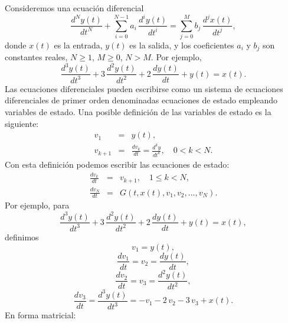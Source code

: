 \documentclass[11pt,a4paper,openany]{book}
\begin{document}
Consideremos una ecuación diferencial
\begin{equation}
	\frac{d^{N} y(t)}{dt^{N}} + \sum_{i=0}^{N-1} a_{i} \, \frac{d^{i} y(t)}{dt^{i}} = \sum_{j=0}^{M} b_{j} \, \frac{d^{j} x(t)}{dt^{j}},
\end{equation}
donde $x(t)$ es la entrada, $y(t)$ es la salida, y los coeficientes $a_{i}$ y $b_{j}$ son constantes reales, $N \geq 1$, $M \geq 0$, $N > M$. Por ejemplo,
\begin{equation}
	\frac{d^{3}y(t)}{dt^{3}} + 3 \, \frac{d^{2}y(t)}{dt^{2}} + 2 \, \frac{dy(t)}{dt} + y(t) = x(t).
\end{equation}
Las ecuaciones diferenciales pueden escribirse como un sistema de ecuaciones diferenciales de primer orden denominadas ecuaciones de estado empleando variables de estado. Una posible definición de las variables de estado es la siguiente:
\begin{eqnarray}
	v_{1}   &=& y(t),                                               \\
	v_{k+1} &=& \frac{dv_{k}}{dt} = \frac{d^{k}y}{dt^{k}}, \quad 0 < k < N .
\end{eqnarray}
Con esta definición podemos escribir las ecuaciones de estado:
\begin{eqnarray}
	\frac{dv_{k}}{dt} &=& v_{k+1}, \quad 1 \leq k < N,  \\
	\frac{dv_{N}}{dt} &=& G(t, x(t), v_{1}, v_{2},...,v_{N}).
\end{eqnarray}
Por ejemplo, para
\begin{equation}
	\frac{d^{3}y(t)}{dt^{3}} + 3 \, \frac{d^{2}y(t)}{dt^{2}} + 2 \, \frac{dy(t)}{dt} + y(t) = x(t),
\end{equation}
definimos
\begin{equation}
	v_{1} = y(t),
\end{equation}
\begin{equation}
	\frac{dv_{1}}{dt} = v_{2} = \frac{dy(t)}{dt},
\end{equation}
\begin{equation}
	\frac{dv_{2}}{dt} = v_{3} = \frac{d^{2}y(t)}{dt^{2}},
\end{equation}
\begin{equation}
	\frac{dv_{3}}{dt} = \frac{d^{3}y(t)}{dt^{3}} = -v_{1} - 2 \, v_{2} - 3 \, v_{3} + x(t).
\end{equation}
En forma matricial:
\end{document}
